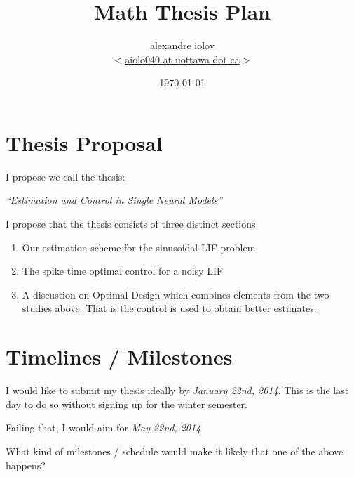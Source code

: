 \documentclass{article}
\begin{document}
\title{Math Thesis Plan}
\author{alexandre iolov\\ $<$\href{mailto:aiolo040@uottawa.ca}
		{aiolo040 at uottawa dot ca}$>$
		}

\date{\today}

\maketitle

\tableofcontents

\section{Thesis Proposal}
I propose we call the thesis:

{\large \sl ``Estimation and Control in Single Neural Models''}

I propose that the thesis consists of three distinct sections

\begin{enumerate}
  \item Our estimation scheme for the sinusoidal LIF problem 
  \item The spike time optimal control for a noisy LIF 
  \item A discustion on Optimal Design which combines elements from the two
  studies above. That is the control is used to obtain better estimates.
\end{enumerate}


\section{Timelines / Milestones}
I would like to submit my thesis ideally by {\sl January 22nd, 2014}. This is
the last day to do so without signing up for the winter semester. 

Failing that, I would aim for {\sl May 22nd, 2014}

What kind of milestones / schedule would make it likely that one of the
above happens?
\end{document}
